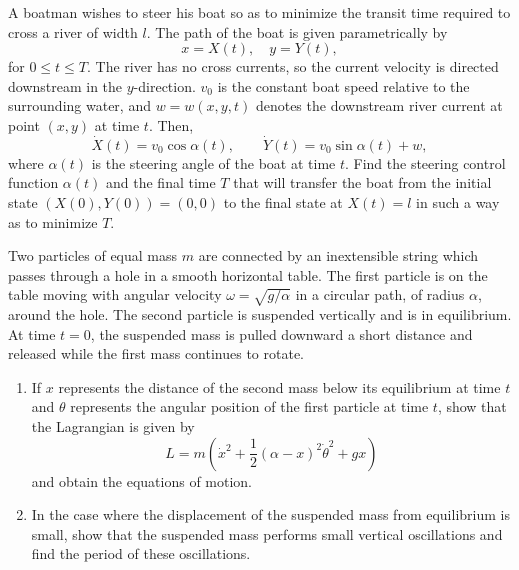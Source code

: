 \begin{Exercise}
  A boatman wishes to steer his boat so as to minimize the transit time
  required to cross a river of width $l$.  The path of the boat is given
  parametrically by
  \[
  x = X(t), \quad y = Y(t),
  \]
  for $0 \leq t \leq T$.  The river has no cross currents, so the current
  velocity is directed downstream in the $y$-direction.
  $v_0$ is the constant boat speed relative to the surrounding water,
  and $w = w(x,y,t)$ denotes the downstream river current at point
  $(x,y)$ at time $t$.  Then,
  \[
  \dot{X}(t) = v_0 \cos \alpha(t), \qquad
  \dot{Y}(t) = v_0 \sin \alpha(t) + w,
  \]
  where $\alpha(t)$ is the steering angle of the boat at time $t$.  Find the
  steering control function $\alpha(t)$ and the final time $T$ that will
  transfer the boat from the initial state $(X(0), Y(0)) = (0,0)$ to 
  the final state at $X(t) = l$ in such a way as to minimize $T$.
\end{Exercise}



\begin{Exercise}
  Two particles of equal mass $m$ are connected by an inextensible string
  which passes through a hole in a smooth horizontal table.  The first
  particle is on the table moving with angular velocity 
  $\omega = \sqrt{g/\alpha}$ in a circular path, of radius $\alpha$, around
  the hole.  The second particle is suspended vertically and is in equilibrium.
  At time $t = 0$, the suspended mass is pulled downward a short distance
  and released while the first mass continues to rotate.  
  \begin{enumerate}
  \item
    If $x$ represents the distance of the second mass below its equilibrium
    at time $t$ and $\theta$ represents the angular position of the first particle
    at time $t$, show that the Lagrangian is given by
    \[
    L = m \left( \dot{x}^2 + \frac{1}{2} (\alpha - x)^2 \dot{\theta}^2 + g x
    \right)
    \]
    and obtain the equations of motion.
  \item
    In the case where the displacement of the suspended mass from equilibrium is
    small, show that the suspended mass performs small vertical oscillations
    and find the period of these oscillations.
  \end{enumerate}
\end{Exercise}



